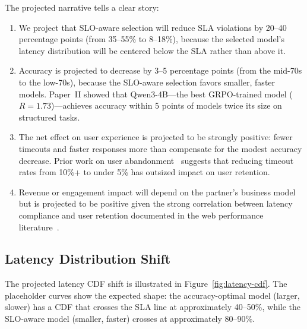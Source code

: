 \documentclass[11pt]{article}
\begin{document}
The projected narrative tells a clear story:

\begin{enumerate}[leftmargin=16pt]
    \item We project that SLO-aware selection will reduce SLA violations by 20--40 percentage points (from 35--55\% to 8--18\%), because the selected model's latency distribution will be centered below the SLA rather than above it.
    \item Accuracy is projected to decrease by 3--5 percentage points (from the mid-70s to the low-70s), because the SLO-aware selection favors smaller, faster models. Paper~II showed that Qwen3-4B---the best GRPO-trained model ($R = 1.73$)---achieves accuracy within 5 points of models twice its size on structured tasks.
    \item The net effect on user experience is projected to be strongly positive: fewer timeouts and faster responses more than compensate for the modest accuracy decrease. Prior work on user abandonment~\cite{akamai2017performance} suggests that reducing timeout rates from 10\%+ to under 5\% has outsized impact on user retention.
    \item Revenue or engagement impact will depend on the partner's business model but is projected to be positive given the strong correlation between latency compliance and user retention documented in the web performance literature~\cite{dean2013tail}.
\end{enumerate}

\subsection{Latency Distribution Shift}

The projected latency CDF shift is illustrated in Figure~\ref{fig:latency-cdf}. The placeholder curves show the expected shape: the accuracy-optimal model (larger, slower) has a CDF that crosses the SLA line at approximately 40--50\%, while the SLO-aware model (smaller, faster) crosses at approximately 80--90\%.
\end{document}
